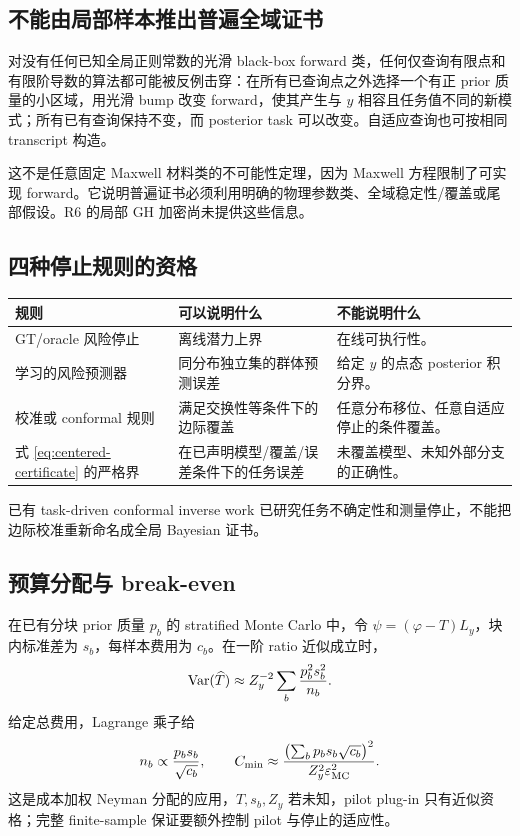 \subsection{不能由局部样本推出普遍全域证书}
对没有任何已知全局正则常数的光滑 black-box forward 类，任何仅查询有限点和有限阶导数的算法都可能被反例击穿：在所有已查询点之外选择一个有正 prior 质量的小区域，用光滑 bump 改变 forward，使其产生与 $y$ 相容且任务值不同的新模式；所有已有查询保持不变，而 posterior task 可以改变。自适应查询也可按相同 transcript 构造。

这不是任意固定 Maxwell 材料类的不可能性定理，因为 Maxwell 方程限制了可实现 forward。它说明普遍证书必须利用明确的物理参数类、全域稳定性/覆盖或尾部假设。R6 的局部 GH 加密尚未提供这些信息。

\subsection{四种停止规则的资格}
\begin{longtable}{p{.24\linewidth}p{.42\linewidth}p{.26\linewidth}}
\toprule
规则 & 可以说明什么 & 不能说明什么\\
\midrule
GT/oracle 风险停止 & 离线潜力上界 & 在线可执行性。\\
学习的风险预测器 & 同分布独立集的群体预测误差 & 给定 $y$ 的点态 posterior 积分界。\\
校准或 conformal 规则 & 满足交换性等条件下的边际覆盖 & 任意分布移位、任意自适应停止的条件覆盖。\\
式 \eqref{eq:centered-certificate} 的严格界 & 在已声明模型/覆盖/误差条件下的任务误差 & 未覆盖模型、未知外部分支的正确性。\\
\bottomrule
\end{longtable}
已有 task-driven conformal inverse work 已研究任务不确定性和测量停止，不能把边际校准重新命名成全局 Bayesian 证书。

\subsection{预算分配与 break-even}
在已有分块 prior 质量 $p_b$ 的 stratified Monte Carlo 中，令
$\psi=(\varphi-T)L_y$，块内标准差为 $s_b$，每样本费用为 $c_b$。在一阶 ratio 近似成立时，
\[
\operatorname{Var}(\widehat T)\approx
Z_y^{-2}\sum_b\frac{p_b^2s_b^2}{n_b}.
\]
给定总费用，Lagrange 乘子给
\[
n_b\propto \frac{p_bs_b}{\sqrt{c_b}},
\qquad
C_{\min}\approx
\frac{\left(\sum_bp_bs_b\sqrt{c_b}\right)^2}{Z_y^2\varepsilon_{\rm MC}^2}.
\]
这是成本加权 Neyman 分配的应用，$T,s_b,Z_y$ 若未知，pilot plug-in 只有近似资格；完整 finite-sample 保证要额外控制 pilot 与停止的适应性。

